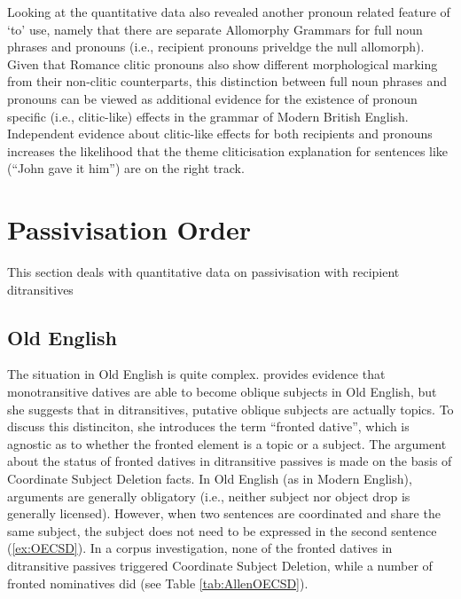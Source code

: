 	Looking at the quantitative data also revealed another pronoun related feature of `to' use, namely that there are separate Allomorphy Grammars for full noun phrases and pronouns (i.e., recipient pronouns priveldge the null allomorph). Given that Romance clitic pronouns also show different morphological marking from their non-clitic counterparts, this distinction between full noun phrases and pronouns can be viewed as additional evidence for the existence of pronoun specific (i.e., clitic-like) effects in the grammar of Modern British English. Independent evidence about clitic-like effects for both recipients and pronouns increases the likelihood that the theme cliticisation explanation for sentences like (``John gave it him'') are on the right track.

\section{Passivisation Order}

	This section deals with quantitative data on passivisation with recipient ditransitives 

\subsection{Old English}
	The situation in Old English is quite complex. \cite{Allen.1999} provides evidence that monotransitive datives are able to become oblique subjects in Old English, but she suggests that in ditransitives, putative oblique subjects are actually topics. To discuss this distinciton, she introduces the term ``fronted dative'', which is agnostic as to whether the fronted element is a topic or a subject. The argument about the status of fronted datives in ditransitive passives is made on the basis of Coordinate Subject Deletion facts. In Old English (as in Modern English), arguments are generally obligatory (i.e., neither subject nor object drop is generally licensed). However, when two sentences are coordinated and share the same subject, the subject does not need to be expressed in the second sentence (\ref{ex:OECSD}). In a corpus investigation, none of the fronted datives in ditransitive passives triggered Coordinate Subject Deletion, while a number of fronted nominatives did (see Table \ref{tab:AllenOECSD}). 

